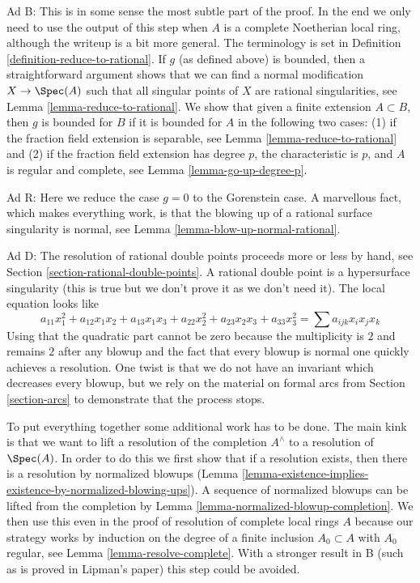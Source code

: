 \medskip\noindent
Ad B: This is in some sense the most subtle part of the proof.
In the end we only need to use the output of this step when $A$
is a complete Noetherian local ring, although the writeup is a
bit more general. The terminology is set in
Definition \ref{definition-reduce-to-rational}.
If $g$ (as defined above) is bounded, then a straightforward
argument shows that we can find a normal modification $X \to \Spec(A)$
such that all singular points of $X$ are rational singularities, see
Lemma \ref{lemma-reduce-to-rational}. We show that given a finite extension
$A \subset B$, then $g$ is bounded for $B$ if it is bounded for $A$
in the following two cases: (1) if the fraction field extension
is separable, see Lemma \ref{lemma-reduce-to-rational} and
(2) if the fraction field extension has degree $p$,
the characteristic is $p$, and $A$ is regular and complete, see
Lemma \ref{lemma-go-up-degree-p}.

\medskip\noindent
Ad R: Here we reduce the case $g = 0$ to the Gorenstein case.
A marvellous fact, which makes everything work, is that the
blowing up of a rational surface singularity is normal, see
Lemma \ref{lemma-blow-up-normal-rational}.

\medskip\noindent
Ad D: The resolution of rational double points proceeds more or
less by hand, see
Section \ref{section-rational-double-points}.
A rational double point
is a hypersurface singularity (this is true but we don't prove it
as we don't need it). The local equation looks like
$$
a_{11} x_1^2 + a_{12} x_1x_2 + a_{13}x_1x_3 + a_{22} x_2^2 +
a_{23} x_2x_3 + a_{33} x_3^2 =
\sum a_{ijk} x_ix_jx_k
$$
Using that the quadratic part cannot be zero because the multiplicity
is $2$ and remains $2$ after any blowup and the fact that every blowup
is normal one quickly achieves a resolution. One twist is that we
do not have an invariant which decreases every blowup, but we rely
on the material on formal arcs from Section \ref{section-arcs}
to demonstrate that the process stops.

\medskip\noindent
To put everything together some additional work has
to be done. The main kink is that we want to lift a resolution
of the completion $A^\wedge$ to a resolution of $\Spec(A)$.
In order to do this we first show that if a resolution exists,
then there is a resolution by normalized blowups
(Lemma \ref{lemma-existence-implies-existence-by-normalized-blowing-ups}).
A sequence of normalized blowups can be lifted from the completion
by Lemma \ref{lemma-normalized-blowup-completion}.
We then use this even in the proof of resolution of complete
local rings $A$ because our strategy works by induction
on the degree of a finite inclusion $A_0 \subset A$ with
$A_0$ regular, see Lemma \ref{lemma-resolve-complete}.
With a stronger result in B (such as is proved in Lipman's paper)
this step could be avoided.




